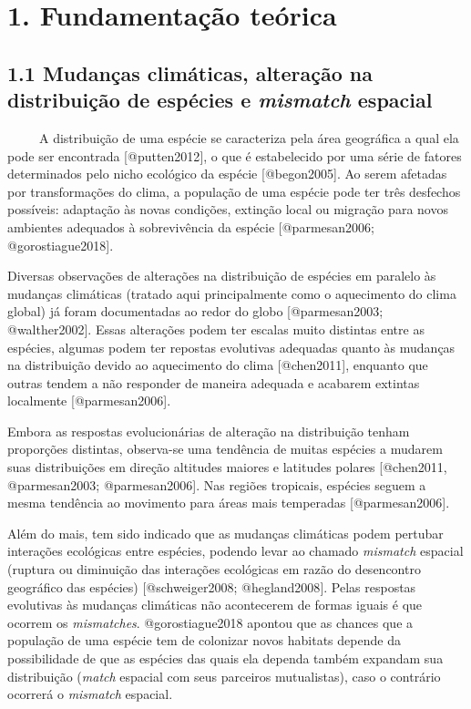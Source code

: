 \documentclass[
  11pt,
]{article}
\author{}
\date{\vspace{-2.5em}}
\begin{document}
\clearpage

\hypertarget{fundamentauxe7uxe3o-teuxf3rica}{%
\section{1. Fundamentação
teórica}\label{fundamentauxe7uxe3o-teuxf3rica}}

\hypertarget{mudanuxe7as-climuxe1ticas-alterauxe7uxe3o-na-distribuiuxe7uxe3o-de-espuxe9cies-e-mismatch-espacial}{%
\subsection{\texorpdfstring{1.1 Mudanças climáticas, alteração na
distribuição de espécies e \emph{mismatch}
espacial}{1.1 Mudanças climáticas, alteração na distribuição de espécies e mismatch espacial}}\label{mudanuxe7as-climuxe1ticas-alterauxe7uxe3o-na-distribuiuxe7uxe3o-de-espuxe9cies-e-mismatch-espacial}}

~~~~~A distribuição de uma espécie se caracteriza pela área geográfica a
qual ela pode ser encontrada {[}@putten2012{]}, o que é estabelecido por
uma série de fatores determinados pelo nicho ecológico da espécie
{[}@begon2005{]}. Ao serem afetadas por transformações do clima, a
população de uma espécie pode ter três desfechos possíveis: adaptação às
novas condições, extinção local ou migração para novos ambientes
adequados à sobrevivência da espécie {[}@parmesan2006;
@gorostiague2018{]}.

Diversas observações de alterações na distribuição de espécies em
paralelo às mudanças climáticas (tratado aqui principalmente como o
aquecimento do clima global) já foram documentadas ao redor do globo
{[}@parmesan2003; @walther2002{]}. Essas alterações podem ter escalas
muito distintas entre as espécies, algumas podem ter repostas evolutivas
adequadas quanto às mudanças na distribuição devido ao aquecimento do
clima {[}@chen2011{]}, enquanto que outras tendem a não responder de
maneira adequada e acabarem extintas localmente {[}@parmesan2006{]}.

Embora as respostas evolucionárias de alteração na distribuição tenham
proporções distintas, observa-se uma tendência de muitas espécies a
mudarem suas distribuições em direção altitudes maiores e latitudes
polares {[}@chen2011, @parmesan2003; @parmesan2006{]}. Nas regiões
tropicais, espécies seguem a mesma tendência ao movimento para áreas
mais temperadas {[}@parmesan2006{]}.

Além do mais, tem sido indicado que as mudanças climáticas podem
pertubar interações ecológicas entre espécies, podendo levar ao chamado
\emph{mismatch} espacial (ruptura ou diminuição das interações
ecológicas em razão do desencontro geográfico das espécies)
{[}@schweiger2008; @hegland2008{]}. Pelas respostas evolutivas às
mudanças climáticas não acontecerem de formas iguais é que ocorrem os
\emph{mismatches}. @gorostiague2018 apontou que as chances que a
população de uma espécie tem de colonizar novos habitats depende da
possibilidade de que as espécies das quais ela dependa também expandam
sua distribuição (\emph{match} espacial com seus parceiros mutualistas),
caso o contrário ocorrerá o \emph{mismatch} espacial.
\end{document}
